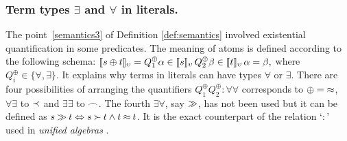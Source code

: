 \subsubsection{Term types $\exists$ and $\forall$ in literals.}
%
The point~\ref {semantics3} of Definition \ref{def:semantics} involved
existential quantification in some predicates.  The meaning of atoms is
defined according to the following schema: $[\![s\oplus t]\!]_{\upsilon} = Q^\oplus_1
\alpha\in [\![s]\!]_{\upsilon}\, Q^\oplus_2\beta \in [\![t]\!]_{\upsilon}\, \alpha = \beta,$ where
\(Q^\oplus_i\in \{\forall ,\exists \}\).  It explains why terms in literals
can have types $\forall$ or $\exists$.
There are four possibilities of arranging the quantifiers $Q_1^\oplus
Q_2^\oplus : \forall\forall$ corresponds to $\oplus=\mathbin{\approx}$, $\forall\exists$ to
$\mathbin{\prec}$ and $\exists\exists$ to $\mathbin{\frown}$.  The fourth $\exists\forall$, say
$\mathbin{\gg}$, has not been used but it can be defined as $s\mathbin{\gg} t\Leftrightarrow
s\mathbin{\succ} t\land t\mathbin{\approx} t$.  It is the exact counterpart of the relation `$:$'
used in {\em unified algebras} \cite {uni-al}.
%
%


